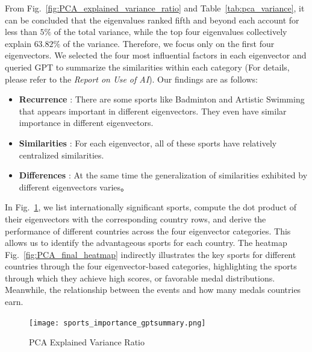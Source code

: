 \documentclass{mcmthesis}
\begin{document}
From  Fig.~\ref{fig:PCA_explained_variance_ratio} and Table~\ref{tab:pca_variance}, it can be concluded that the eigenvalues ranked fifth and beyond each account for less than $5\%$ of the total variance, while the top four eigenvalues collectively explain $63.82\%$ of the variance. Therefore, we focus only on the first four eigenvectors. We selected the four most influential factors in each eigenvector and queried GPT to summarize the similarities within each category (For details, please refer to the \emph{Report on Use of AI}). Our findings are as follows:

\begin{itemize}
\item {\bf Recurrence }: There are some sports like Badminton and Artistic Swimming that appears important in different eigenvectors. They even have similar importance in different eigenvectors.
\item {\bf Similarities }: For each eigenvector, all of these sports have relatively centralized similarities. 
\item {\bf Differences }: At the same time the generalization of similarities exhibited by different eigenvectors varies。
\end{itemize}

In Fig.~\ref{fig:sports_importance_gptsummary}, we list internationally significant sports, compute the dot product of their eigenvectors with the corresponding country rows, and derive the performance of different countries across the four eigenvector categories. This allows us to identify the advantageous sports for each country. The heatmap Fig.~\ref{fig:PCA_final_heatmap} indirectly illustrates the key sports for different countries through the four eigenvector-based categories, highlighting the sports through which they achieve high scores, or favorable medal distributions. Meanwhile, the relationship between the events and how many medals countries earn.


\begin{figure}[h!]
    \centering
    \texttt{[image: sports\_importance\_gptsummary.png]}
    \caption{PCA Explained Variance Ratio}
    \label{fig:sports_importance_gptsummary}
\end{figure}

\end{document}
